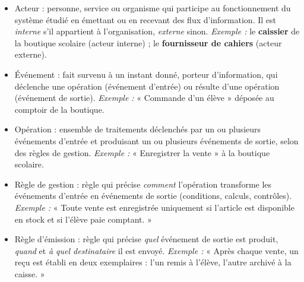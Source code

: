 \documentclass[11pt]{article}
\newcommand{\cle}[1]{{\popxbold\color{popdark}#1}}
\begin{document}
\begin{corrige}
\begin{itemize}
\item \cle{Acteur} : personne, service ou organisme qui participe au fonctionnement du système étudié en émettant ou en recevant des flux d'information. Il est \emph{interne} s'il appartient à l'organisation, \emph{externe} sinon. \emph{Exemple :} le \textbf{caissier} de la boutique scolaire (acteur interne) ; le \textbf{fournisseur de cahiers} (acteur externe).
\item \cle{Événement} : fait survenu à un instant donné, porteur d'information, qui déclenche une opération (événement d'entrée) ou résulte d'une opération (événement de sortie). \emph{Exemple :} « Commande d'un élève » déposée au comptoir de la boutique.
\item \cle{Opération} : ensemble de traitements déclenchés par un ou plusieurs événements d'entrée et produisant un ou plusieurs événements de sortie, selon des règles de gestion. \emph{Exemple :} « Enregistrer la vente » à la boutique scolaire.
\item \cle{Règle de gestion} : règle qui précise \emph{comment} l'opération transforme les événements d'entrée en événements de sortie (conditions, calculs, contrôles). \emph{Exemple :} « Toute vente est enregistrée uniquement si l'article est disponible en stock et si l'élève paie comptant. »
\item \cle{Règle d'émission} : règle qui précise \emph{quel} événement de sortie est produit, \emph{quand} et \emph{à quel destinataire} il est envoyé. \emph{Exemple :} « Après chaque vente, un reçu est établi en deux exemplaires : l'un remis à l'élève, l'autre archivé à la caisse. »
\end{itemize}
\end{corrige}
\end{document}
